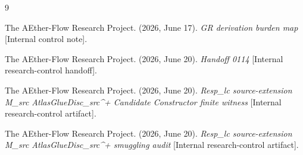 \documentclass[11pt]{article}
\begin{document}
\begin{thebibliography}{9}

The AEther-Flow Research Project. (2026, June 17). \emph{GR derivation burden
map} [Internal control note].

The AEther-Flow Research Project. (2026, June 20). \emph{Handoff 0114}
[Internal research-control handoff].

The AEther-Flow Research Project. (2026, June 20). \emph{Resp\_lc
source-extension M\_src AtlasGlueDisc\_src\^{}+ Candidate Constructor finite
witness} [Internal research-control artifact].

The AEther-Flow Research Project. (2026, June 20). \emph{Resp\_lc
source-extension M\_src AtlasGlueDisc\_src\^{}+ smuggling audit} [Internal
research-control artifact].

\end{thebibliography}
\end{document}
